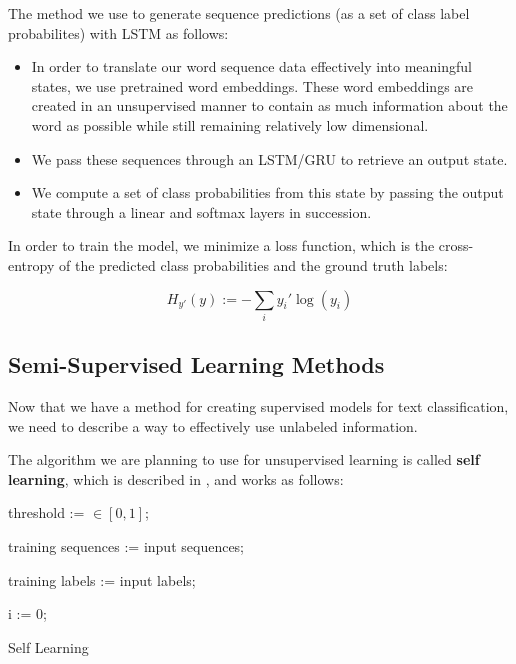 \documentclass[11pt,letterpaper]{article}
\begin{document}
The method we use to generate sequence predictions (as a set of class label probabilites) with LSTM as follows:

\begin{itemize}
	\item In order to translate our word sequence data effectively into meaningful states, we use pretrained word embeddings. These word embeddings are created in an unsupervised manner to contain as much information about the word as possible while still remaining relatively low dimensional.
	\item We pass these sequences through an LSTM/GRU to retrieve an output state.
	\item We compute a set of class probabilities from this state by passing the output state through a linear and softmax layers in succession.
\end{itemize}

In order to train the model, we minimize a loss function, which is the cross-entropy of the predicted class probabilities and the ground truth labels:

\begin{equation}
	H_{y'} (y) := - \sum_{i} y_{i}' \log (y_i)
\end{equation}



\clearpage
\subsection{Semi-Supervised Learning Methods}

Now that we have a method for creating supervised models for text classification, we need to describe a way to effectively use unlabeled information.

The algorithm we are planning to use for unsupervised learning is called \textbf{self learning}, which is described in \cite{mihalcea2004co}, and works as follows:

\begin{algorithm}[H]
 threshold := $\in [0, 1]$;
 
 training sequences := input sequences;
 
 training labels := input labels;
 
 i := 0;
 
 \caption{Self Learning}
\end{algorithm}
\end{document}
